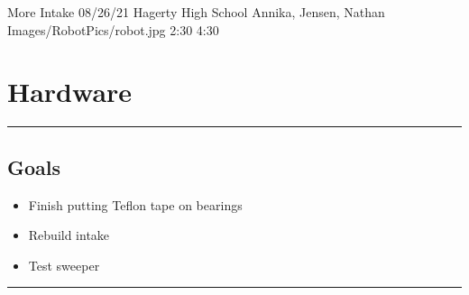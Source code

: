 \insertmeeting 
	{More Intake} 
	{08/26/21}
	{Hagerty High School}
	{Annika, Jensen, Nathan}
	{Images/RobotPics/robot.jpg}
	{2:30}
  {4:30}
	
\section*{Hardware}
\noindent\hfil\rule{\textwidth}{.4pt}\hfil
\subsection*{Goals}
\begin{itemize}
    \item Finish putting Teflon tape on bearings
	\item Rebuild intake
	\item Test sweeper
  

\end{itemize} 

\noindent\hfil\rule{\textwidth}{.4pt}\hfil

